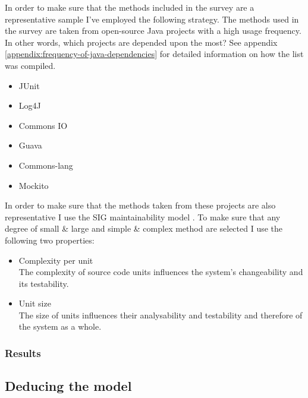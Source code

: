 In order to make sure that the methods included in the survey are a representative sample I've employed the following strategy.
The methods used in the survey are taken from open-source Java projects with a high usage frequency. In other words, which projects are depended upon the most?  See appendix \ref{appendix:frequency-of-java-dependencies} for detailed information on how the list was compiled.

\begin{itemize}
	\item JUnit
	\item Log4J
	\item Commons IO
	\item Guava
	\item Commons-lang
	\item Mockito
\end{itemize}

In order to make sure that the methods taken from these projects are also representative I use the SIG maintainability model \cite{sigmodel}. To make sure that any degree of small \& large and simple \& complex method are selected I use the following two properties:

\begin{itemize}
	\item Complexity per unit\\
	{\small The complexity of source code units inﬂuences the system’s changeability and its testability.}
	
	\item Unit size\\
	{\small The size of units inﬂuences their analysability and testability and therefore of the system as a whole.}
\end{itemize}

\subsubsection{Results}

\subsection{Deducing the model}